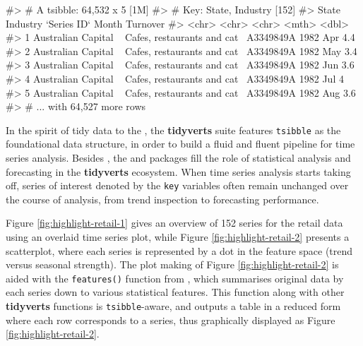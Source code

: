 \begin{Schunk}
\begin{Soutput}
#> # A tsibble: 64,532 x 5 [1M]
#> # Key:       State, Industry [152]
#>   State                Industry                    `Series ID`    Month Turnover
#>   <chr>                <chr>                       <chr>          <mth>    <dbl>
#> 1 Australian Capital ~ Cafes, restaurants and cat~ A3349849A   1982 Apr      4.4
#> 2 Australian Capital ~ Cafes, restaurants and cat~ A3349849A   1982 May      3.4
#> 3 Australian Capital ~ Cafes, restaurants and cat~ A3349849A   1982 Jun      3.6
#> 4 Australian Capital ~ Cafes, restaurants and cat~ A3349849A   1982 Jul      4  
#> 5 Australian Capital ~ Cafes, restaurants and cat~ A3349849A   1982 Aug      3.6
#> # ... with 64,527 more rows
\end{Soutput}
\end{Schunk}

In the spirit of tidy data to the 
\citep{Wickham2019}, the \textbf{tidyverts} suite features
\texttt{tsibble} as the foundational data structure, in order to build a
fluid and fluent pipeline for time series analysis. Besides
, the  and  packages
fill the role of statistical analysis and forecasting in the
\textbf{tidyverts} ecosystem. When time series analysis starts taking
off, series of interest denoted by the \texttt{key} variables often
remain unchanged over the course of analysis, from trend inspection to
forecasting performance.

Figure \ref{fig:highlight-retail-1} gives an overview of 152 series for
the retail data using an overlaid time series plot, while Figure
\ref{fig:highlight-retail-2} presents a scatterplot, where each series
is represented by a dot in the feature space (trend versus seasonal
strength). The plot making of Figure \ref{fig:highlight-retail-2} is
aided with the \texttt{features()} function from , which
summarises original data by each series down to various statistical
features. This function along with other \textbf{tidyverts} functions is
\texttt{tsibble}-aware, and outputs a table in a reduced form where each
row corresponds to a series, thus graphically displayed as Figure
\ref{fig:highlight-retail-2}.

